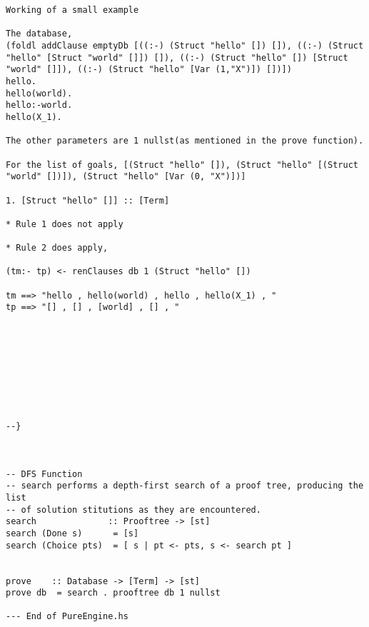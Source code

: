 \documentclass[thesis-solanki.tex]{files}
\begin{document}
\begin{verbatim}
Working of a small example

The database,
(foldl addClause emptyDb [((:-) (Struct "hello" []) []), ((:-) (Struct "hello" [Struct "world" []]) []), ((:-) (Struct "hello" []) [Struct "world" []]), ((:-) (Struct "hello" [Var (1,"X")]) [])])
hello.
hello(world).
hello:-world.
hello(X_1).

The other parameters are 1 nullst(as mentioned in the prove function).

For the list of goals, [(Struct "hello" []), (Struct "hello" [(Struct "world" [])]), (Struct "hello" [Var (0, "X")])]

1. [Struct "hello" []] :: [Term]

* Rule 1 does not apply

* Rule 2 does apply,

(tm:- tp) <- renClauses db 1 (Struct "hello" [])

tm ==> "hello , hello(world) , hello , hello(X_1) , "
tp ==> "[] , [] , [world] , [] , "









--}



-- DFS Function
-- search performs a depth-first search of a proof tree, producing the list
-- of solution stitutions as they are encountered.
search              :: Prooftree -> [st] 
search (Done s)      = [s]
search (Choice pts)  = [ s | pt <- pts, s <- search pt ]


prove    :: Database -> [Term] -> [st]
prove db  = search . prooftree db 1 nullst

--- End of PureEngine.hs
\end{verbatim}
\end{document}
